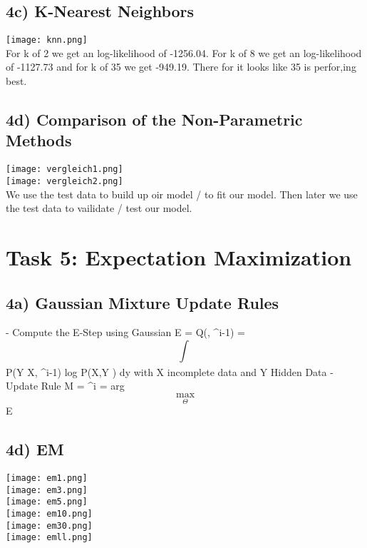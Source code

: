\documentclass{article}
\begin{document}
\subsection{4c) K-Nearest Neighbors}
\texttt{[image: knn.png]}\\
For k of 2 we get an log-likelihood of -1256.04. For k of 8 we get an log-likelihood of -1127.73 and for k of 35 we get -949.19. There for it looks like 35 is perfor,ing best.



\subsection{4d) Comparison of the Non-Parametric Methods}
\texttt{[image: vergleich1.png]}\\
\texttt{[image: vergleich2.png]}\\
We use the test data to build up oir model / to fit our model. Then later we use the test data to vailidate / test our model.
\section{Task 5: Expectation Maximization}
\subsection{4a) Gaussian Mixture Update Rules}

- Compute the E-Step using Gaussian
E = Q(\Theta , \Theta^{i-1}) = \[ \int_{}^{} \, \] P(Y  \vert X, \Theta^{i-1}) log P(X,Y \vert \Theta) dy 
\newline
with X incomplete data and Y Hidden Data
\newline
- Update Rule
M = \Theta^{i} = arg \[\max_{\Theta}\] E

\subsection{4d) EM}
\texttt{[image: em1.png]}\\
\texttt{[image: em3.png]}\\
\texttt{[image: em5.png]}\\
\texttt{[image: em10.png]}\\
\texttt{[image: em30.png]}\\
\texttt{[image: emll.png]}\\


\end{document}
